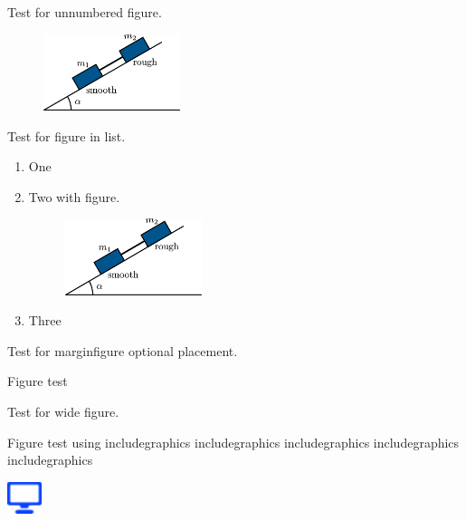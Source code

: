 \documentclass[solutionsatend,twocolumnsolutions]{ouunit}
\begin{document}
Test for unnumbered figure.

\begin{figure}
\includegraphics[width=4cm]{test}
\end{figure}

Test for figure in list.
\begin{enumerate}
\item
One
\item
Two with figure.
\begin{figure}
\includegraphics[width=4cm]{test}
\end{figure}
\item
Three
\end{enumerate}
\lipsum[133]
Test for marginfigure optional placement.
\begin{marginfigure}[-1cm]%
\caption{Figure test \label{fig-ex-test}}
\end{marginfigure}
Test for wide figure.
\begin{widefigure*}
\end{widefigure*}
\lipsum[1]
\begin{marginfigure}
\caption{Figure test using includegraphics includegraphics includegraphics includegraphics includegraphics}\label{fig-cross-marginfigure}
\includegraphics[width=1cm]{icon}
\end{marginfigure}
\end{document}
